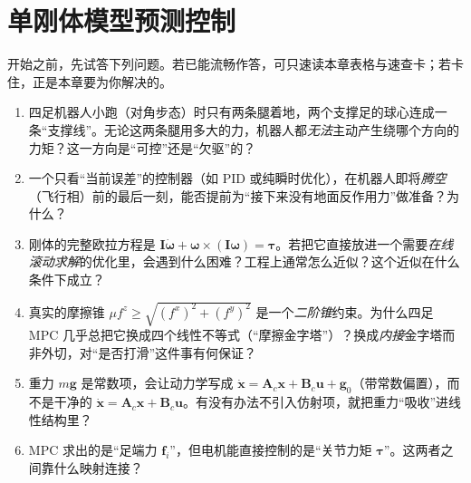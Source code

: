 \chapter{单刚体模型预测控制}
\label{ch:quad_mpc}


\begin{practice}[前置自测]
开始之前，先试答下列问题。若已能流畅作答，可只速读本章表格与速查卡；若卡住，正是本章要为你解决的。
\begin{enumerate}
  \item 四足机器人小跑（对角步态）时只有两条腿着地，两个支撑足的球心连成一条“支撑线”。无论这两条腿用多大的力，机器人都\emph{无法}主动产生绕哪个方向的力矩？这一方向是“可控”还是“欠驱”的？
  \item 一个只看“当前误差”的控制器（如 PID 或纯瞬时优化），在机器人即将\emph{腾空}（飞行相）前的最后一刻，能否提前为“接下来没有地面反作用力”做准备？为什么？
  \item 刚体的完整欧拉方程是 $\mathbf{I}\dot{\boldsymbol{\omega}}+\boldsymbol{\omega}\times(\mathbf{I}\boldsymbol{\omega})=\boldsymbol{\tau}$。若把它直接放进一个需要\emph{在线滚动求解}的优化里，会遇到什么困难？工程上通常怎么近似？这个近似在什么条件下成立？
  \item 真实的摩擦锥 $\mu f^z\ge\sqrt{(f^x)^2+(f^y)^2}$ 是一个\emph{二阶锥}约束。为什么四足 MPC 几乎总把它换成四个线性不等式（“摩擦金字塔”）？换成\emph{内接}金字塔而非外切，对“是否打滑”这件事有何保证？
  \item 重力 $m\mathbf{g}$ 是常数项，会让动力学写成 $\dot{\mathbf{x}}=\mathbf{A}_c\mathbf{x}+\mathbf{B}_c\mathbf{u}+\mathbf{g}_0$（带常数偏置），而不是干净的 $\dot{\mathbf{x}}=\mathbf{A}_c\mathbf{x}+\mathbf{B}_c\mathbf{u}$。有没有办法不引入仿射项，就把重力“吸收”进线性结构里？
  \item MPC 求出的是“足端力 $\mathbf{f}_i$”，但电机能直接控制的是“关节力矩 $\boldsymbol{\tau}$”。这两者之间靠什么映射连接？
\end{enumerate}
\end{practice}

